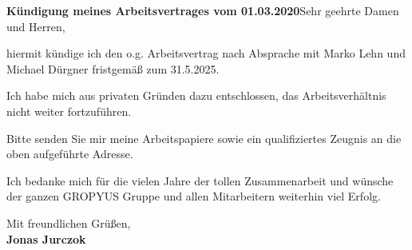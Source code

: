 \documentclass[11pt,a4paper,sans]{moderncv} %
\begin{document}


\clearpage

\date{\today} %
\opening{\textbf{Kündigung meines Arbeitsvertrages vom 01.03.2020}\newline{}\newline{}Sehr geehrte Damen und Herren,}
\closing{} 

\makelettertitle

hiermit kündige ich den o.g. Arbeitsvertrag nach Absprache mit Marko Lehn und Michael Dürgner fristgemäß zum 31.5.2025.
 
Ich habe mich aus privaten Gründen dazu entschlossen, das Arbeitsverhältnis nicht weiter fortzuführen.
 
Bitte senden Sie mir meine Arbeitspapiere sowie ein qualifiziertes Zeugnis an die oben aufgeführte Adresse. 

Ich bedanke mich für die vielen Jahre der tollen Zusammenarbeit und wünsche der ganzen GROPYUS Gruppe und allen Mitarbeitern weiterhin viel Erfolg.

Mit freundlichen Grüßen,\\[3.5em]

\bfseries{Jonas Jurczok}


\end{document}
